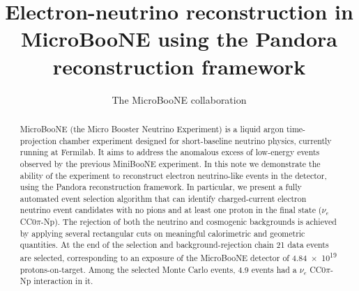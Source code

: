 \documentclass[a4paper]{article}
\title{Electron-neutrino reconstruction in MicroBooNE using the Pandora reconstruction framework}
\author{The MicroBooNE collaboration}
\begin{document}
\maketitle
\tableofcontents

\listoftodos

\begin{abstract}
MicroBooNE (the Micro Booster Neutrino Experiment) is a liquid argon
time-projection chamber experiment designed for short-baseline neutrino physics, currently running at Fermilab. It aims to address the anomalous excess of low-energy events observed by the previous MiniBooNE experiment. In this note we demonstrate the ability of the experiment to reconstruct electron neutrino-like events in the detector, using the Pandora reconstruction framework. In particular, we present a fully automated event selection algorithm that can identify charged-current electron neutrino event candidates with no pions and at least one proton in the final state ($\nu_{e}$ CC0$\pi$-Np). The rejection of both the neutrino and cosmogenic backgrounds is achieved by applying several rectangular cuts on meaningful calorimetric and geometric quantities. At the end of the selection and background-rejection chain 21 data events are selected, corresponding to an exposure of the MicroBooNE detector of \num{4.84e19} protons-on-target. Among the selected Monte Carlo events, 4.9 events had a $\nu_{e}$ CC0$\pi$-Np interaction in it.
\end{abstract}









\newpage

\newpage

\end{document}
